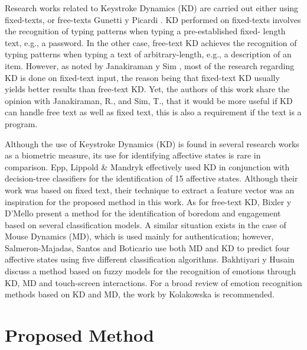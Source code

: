 \documentclass[a4paper,twoside]{article}
\begin{document}
Research works related to Keystroke Dynamics (KD) are carried out either using
fixed-texts, or free-texts Gunetti y Picardi \cite{gunetti2005keystroke}.
KD performed on fixed-texts
involves the recognition of typing patterns when typing a pre-established fixed-
length text, e.g., a password. In the other case, free-text KD achieves the
recognition of typing patterns when typing a text of arbitrary-length, e.g., a
description of an item. However, as noted by Janakiraman y Sim \cite{janakiraman2007keystroke},
most of
the research regarding KD is done on fixed-text input, the reason being that
fixed-text KD usually yields better results than free-text KD. Yet, the authors
of this work share the opinion with Janakiraman, R., and Sim, T., that it would
be more useful if KD can handle free text as well as fixed text, this is also a
requirement if the text is a program.

Although the use of Keystroke Dynamics (KD) is found in several research works
as a biometric measure, its use for identifying affective states is rare in
comparison. Epp, Lippold \& Mandryk \cite{epp2011identifying} effectively used KD in conjunction
with decision-tree classifiers for the identification of 15 affective states.
Although their work was based on fixed text, their technique to extract a feature
vector was an inspiration for the proposed method in this work. As for free-text
KD, Bixler y D'Mello \cite{bixler2013detecting} present a method for the identification of boredom
and engagement based on several classification models. A similar situation exists in the case of Mouse Dynamics (MD), which is used mainly for authentication; however, Salmeron-Majadas, Santos
and Boticario \cite{salmeron2014exploring} use both MD and KD to predict four affective states using
five different classification algorithms. Bakhtiyari y Husain \cite{bakhtiyari2014fuzzy} discuss a
method based on fuzzy models for the recognition of emotions through KD, MD and
touch-screen interactions. For a broad review of emotion recognition methods
based on KD and MD, the work by Kolakowska \cite{kolakowska2013review} is recommended.

\section{Proposed Method}
\label{sec:method}
\end{document}

